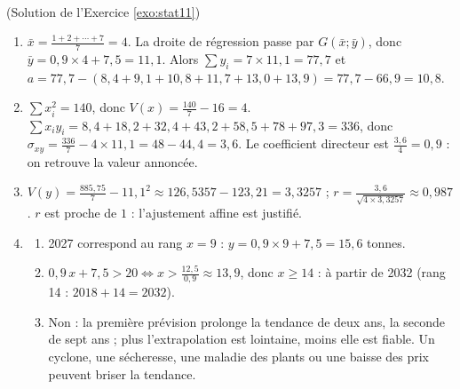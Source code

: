 \begin{corrige}
\begin{sol} ~ \\
(Solution de l'Exercice \ref{exo:stat11})
\begin{enumerate}
\item $\bar{x} = \frac{1 + 2 + \cdots + 7}{7} = 4$. La droite de r\'egression passe par $G(\bar{x} ; \bar{y})$, donc
      $\bar{y} = 0,9 \times 4 + 7,5 = 11,1$. Alors $\sum y_i = 7 \times 11,1 = 77,7$ et 
      $a = 77,7 - (8,4 + 9,1 + 10,8 + 11,7 + 13,0 + 13,9) = 77,7 - 66,9 = 10,8$.
\item $\sum x_i^2 = 140$, donc $V(x) = \frac{140}{7} - 16 = 4$.
      $\sum x_i y_i = 8,4 + 18,2 + 32,4 + 43,2 + 58,5 + 78 + 97,3 = 336$, donc $\sigma_{xy} = \frac{336}{7} - 4 \times 11,1 = 48 - 44,4 = 3,6$.
      Le coefficient directeur est $\frac{3,6}{4} = 0,9$ : on retrouve la valeur annonc\'ee.
\item $V(y) = \frac{885,75}{7} - 11,1^2 \approx 126,5357 - 123,21 = 3,3257$ ; 
      $r = \frac{3,6}{\sqrt{4 \times 3,3257}} \approx 0,987$. $r$ est proche de $1$ : l'ajustement affine est justifi\'e.
\item \begin{enumerate}
      \item 2027 correspond au rang $x = 9$ : $y = 0,9 \times 9 + 7,5 = 15,6$ tonnes.
      \item $0,9\,x + 7,5 > 20 \iff x > \frac{12,5}{0,9} \approx 13,9$, donc $x \geq 14$ : \`a partir de 2032 
            (rang 14 : $2018 + 14 = 2032$).
      \item Non : la premi\`ere pr\'evision prolonge la tendance de deux ans, la seconde de sept ans ; plus l'extrapolation
            est lointaine, moins elle est fiable. Un cyclone, une s\'echeresse, une maladie des plants ou une baisse des prix
            peuvent briser la tendance.
      \end{enumerate}
\end{enumerate}
\end{sol}
\end{corrige}
